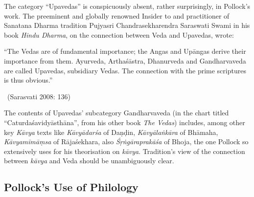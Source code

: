 The category “Upavedas” is conspicuously absent, rather surprisingly, in Pollock’s work. The preeminent and globally renowned Insider to and practitioner of Sanatana Dharma tradition Pujyasri Chandrasekha\-rendra Saraswati Swami in his book \textit{Hindu Dharma}, on the connection between Veda and Upavedas, wrote:

\begin{myquote}
“The Vedas are of fundamental importance; the Angas and Upāngas derive their importance from them. Ayurveda, Arthaśāstra, Dhanurveda and Gandharvaveda are called Upavedas, subsidiary Vedas. The connection with the prime scriptures is thus obvious.” 

\vskip -5pt

~\hfill (Sarasvati 2008: 136)
\end{myquote}

The contents of Upavedas’ subcategory Gandharvaveda (in the chart titled “Caturdaśavidyāsthāna”, from his other book \textit{The Vedas}) includes, among other key \textit{Kāvya} texts like \textit{Kāvyādarśa} of Daṇḍin, \textit{Kāvyālaṅkāra} of Bhāmaha, \textit{Kāvyamīmāṃsa} of Rājaśekhara, also \textit{Śṛṅgāraprakāśa} of Bhoja, the one Pollock so extensively uses for his theorisation on \textit{kāvya}. Tradition’s view of the connection between \textit{kāvya} and Veda should be unambiguously clear.


\subsection{Pollock’s Use of Philology}

\vskip -5pt

